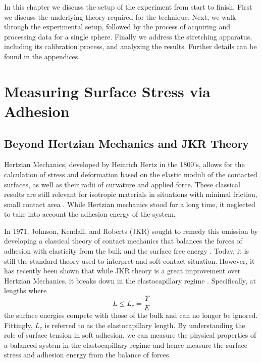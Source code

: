 In this chapter we discuss the setup of the experiment from start to finish. First we discuss the underlying theory required for the technique. Next, we walk through the experimental setup, followed by the process of acquiring and processing data for a single sphere. Finally we address the stretching apparatus, including its calibration process, and analyzing the results. Further details can be found in the appendices.

\section{Measuring Surface Stress via Adhesion}
\subsection{Beyond Hertzian Mechanics and JKR Theory}

Hertzian Mechanics, developed by Heinrich Hertz in the 1800's, allows for the calculation of stress and deformation based on the elastic moduli of the contacted surfaces, as well as their radii of curvature and applied force. These classical results are still relevant for isotropic materials in situations with minimal friction, small contact area \cite{JohnsonHertzBOOK}. While Hertzian mechanics stood for a long time, it neglected to take into account the adhesion energy of the system.  

In 1971, Johnson, Kendall, and Roberts (JKR) sought to remedy this omission by developing a classical theory of contact mechanics that balances the forces of adhesion with elasticity from the bulk and the surface free energy {\cite{johnson1971surface}}. Today, it is still the standard theory used to interpret and soft contact situation. However, it has recently been shown that while JKR theory is a great improvement over Hertzian Mechanics, it breaks down in the elastocapillary regime \cite{style2013surface}. Specifically, at lengths where 
\begin{equation}
\label{EC_regime}
L \leq L_{c} = \frac{\Upsilon}{E}
\end{equation}
the surface energies compete with those of the bulk and can no longer be ignored. Fittingly, $L_c$ is referred to as the elastocapillary length. By understanding the role of surface tension in soft adhesion, we can measure the physical properties of a balanced system in the elastocapillary regime and hence measure the surface stress and adhesion energy from the balance of forces.



